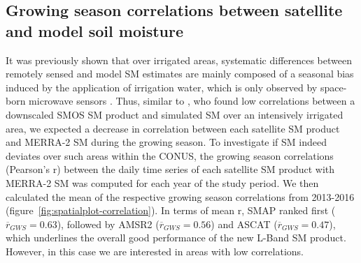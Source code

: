 \documentclass[hess, manuscript]{copernicus}
\begin{document}
\subsection{Growing season correlations between satellite and model soil moisture}
\label{ssec:correlations}
It was previously shown that over irrigated areas, systematic differences between remotely sensed and model SM estimates are mainly composed of a seasonal bias induced by the application of irrigation water, which is only observed by space-born microwave sensors \citep{Kumar_2015,escorihuela2016comparison}. Thus, similar to \citet{escorihuela2016comparison}, who found low correlations between a downscaled SMOS SM product and simulated SM over an intensively irrigated area, we expected a decrease in correlation between each satellite SM product and MERRA-2 SM during the growing season. To investigate if SM indeed deviates over such areas within the CONUS, the growing season correlations (Pearson's r) between the daily time series of each satellite SM product with MERRA-2 SM was computed for each year of the study period. We then calculated the mean of the respective growing season correlations from 2013-2016 (figure~\ref{fig:spatialplot-correlation}). In terms of mean r, SMAP ranked first ($\overline{r}_{GWS}=0.63$), followed by AMSR2 ($\overline{r}_{GWS}=0.56$) and ASCAT ($\overline{r}_{GWS}=0.47$), which underlines the overall good performance of the new L-Band SM product. However, in this case we are interested in areas with low correlations.\\
\end{document}
